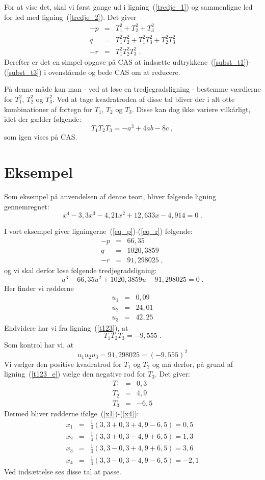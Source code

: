 \documentclass[12pt,oneside,a4paper]{article}
\newcommand{\bea}{\begin{eqnarray}}
\newcommand{\eea}{\end{eqnarray}}
\begin{document}
For at vise det, skal vi først gange ud i ligning~(\ref{tredje_1}) og
sammenligne led for led med ligning~(\ref{tredje_2}). Det giver
\bea
-p &=& T_1^2 + T_2^2 + T_3^2 \\
 q &=& T_1^2T_2^2 + T_1^2T_3^2 + T_2^2T_3^2 \\
-r &=& T_1^2T_2^2T_3^2 \;.
\eea
Derefter er det en simpel opgave på CAS at indsætte
udtrykkene~(\ref{subst_t1})-(\ref{subst_t3}) i ovenstående og bede CAS om at
reducere.

På denne måde kan man - ved at løse en tredjegradsligning - bestemme værdierne
for $T_1^2$, $T_2^2$ og $T_3^2$. Ved at tage kvadratroden af disse tal bliver
der i alt otte kombinationer af fortegn for $T_1$, $T_2$ og $T_3$. Disse kan dog ikke variere vilkårligt, idet der gælder følgende:
\begin{equation}
    T_1 T_2 T_3 = -a^3 + 4ab - 8c \;,
    \label{t123}
\end{equation}
som igen vises på CAS.


\section{Eksempel}
Som eksempel på anvendelsen af denne teori, bliver følgende
ligning gennemregnet:
\begin{equation}
    x^4 - 3,3 x^3 - 4,21 x^2 + 12,633 x - 4,914 = 0 \;.
\end{equation}

I vort eksempel giver ligningerne~(\ref{eq_p})-(\ref{eq_r}) følgende:
\bea
-p &=& 66,35 \\
 q &=& 1020,3859 \\
-r &=& 91,298025\;,
\eea
og vi skal derfor løse følgende tredjegradsligning:
\[
    u^3 - 66,35 u^2 + 1020,3859 u - 91,298025 = 0\;.
\]
Her finder vi rødderne
\bea
u_1 &=& 0,09 \\
u_2 &=& 24,01 \\
u_3 &=& 42,25
\eea
Endvidere har vi fra ligning~(\ref{t123}), at
\begin{equation}
T_1 T_2 T_3 = -9,555\;.
\label {t123_e}
\end{equation}
Som kontrol har vi, at 
\begin{equation}
    u_1u_2u_3 = 91,298025 = (-9,555)^2
\end{equation}
Vi vælger den positive kvadratrod for $T_1$ og $T_2$ og må derfor, på grund af
ligning~(\ref{t123_e}) vælge den negative rod for $T_3$.
Det giver:
\bea
T_1 &=& 0,3 \\
T_2 &=& 4,9 \\
T_3 &=& -6,5
\eea
Dermed bliver rødderne ifølge~(\ref{x1})-(\ref{x4}):
\bea
x_1 &=& \frac14(3,3+0,3+4,9-6,5) = 0,5 \\
x_2 &=& \frac14(3,3+0,3-4,9+6,5) = 1,3 \\
x_3 &=& \frac14(3,3-0,3+4,9+6,5) = 3,6 \\
x_4 &=& \frac14(3,3-0,3-4,9-6,5) = -2,1
\eea
Ved indsættelse ses disse tal at passe.
\end{document}
